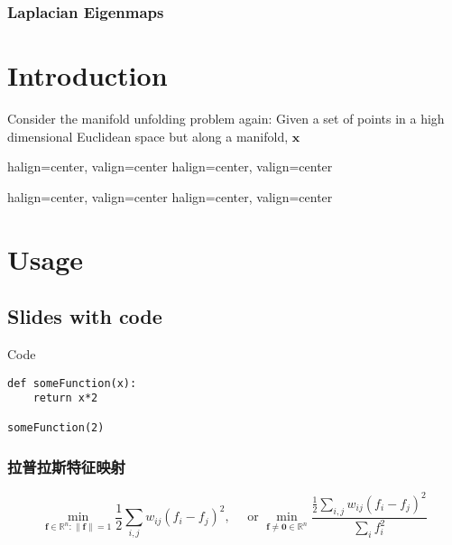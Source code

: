 \begin{frame}
	\frametitle{Laplacian Eigenmaps}

	\section{Introduction}

	Consider the manifold unfolding problem again: Given a set of points in a high dimensional Euclidean space but along a manifold, $\mathbf{x}$
\end{frame}

\begin{frame}
	{halign=center, valign=center}
	{halign=center, valign=center}
\end{frame}

\begin{frame}
	{halign=center, valign=center}
	{halign=center, valign=center}
\end{frame}


\section{Usage}
\subsection{Slides with code}
\begin{frame}[fragile=singleslide]{Code}
	\begin{lstlisting}
def someFunction(x):
	return x*2

someFunction(2)
\end{lstlisting}
\end{frame}

\begin{frame}
	\frametitle{拉普拉斯特征映射}

	\begin{equation}
		\min _{\mathbf{f} \in \mathbb{R}^n:\|\mathbf{f}\|=1} \frac{1}{2} \sum_{i, j} w_{i j}\left(f_i-f_j\right)^2, \quad \text { or } \min _{\mathbf{f} \neq \mathbf{0} \in \mathbb{R}^n} \frac{\frac{1}{2} \sum_{i, j} w_{i j}\left(f_i-f_j\right)^2}{\sum_i f_i^2}
	\end{equation}

\end{frame}

